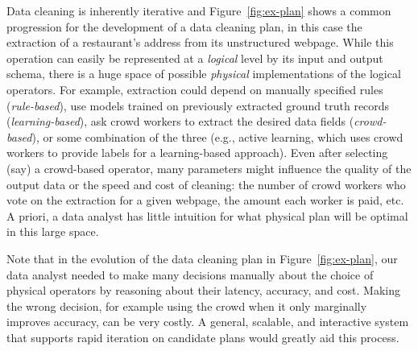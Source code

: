 Data cleaning is inherently iterative and Figure~\ref{fig:ex-plan} shows a common progression for the development of a data cleaning plan, in this case the extraction of a restaurant's address from its unstructured webpage.
While this operation can easily be represented at a \textit{logical} level by its input and output schema, there is a huge space of possible \textit{physical} implementations of the logical operators. 
For example, extraction could depend on manually specified rules (\textit{rule-based}), use models trained on previously extracted ground truth records (\textit{learning-based}), ask crowd workers to extract the desired data fields (\textit{crowd-based}), or some combination of the three (e.g., active learning, which uses crowd workers to provide labels for a learning-based approach).
Even after selecting (say) a crowd-based operator, many parameters might influence the quality of the output data or the speed and cost of cleaning: the number of crowd workers who vote on the extraction for a given webpage, the amount each worker is paid, etc.
A priori, a data analyst has little intuition for what physical plan will be optimal in this large space.

Note that in the evolution of the data cleaning plan in Figure~\ref{fig:ex-plan}, our data analyst needed to make many decisions manually about the choice of physical operators by reasoning about their latency, accuracy, and cost. 
Making the wrong decision, for example using the crowd when it only marginally improves accuracy, can be very costly.
A general, scalable, and interactive system that supports rapid iteration on candidate plans would greatly aid this process.



